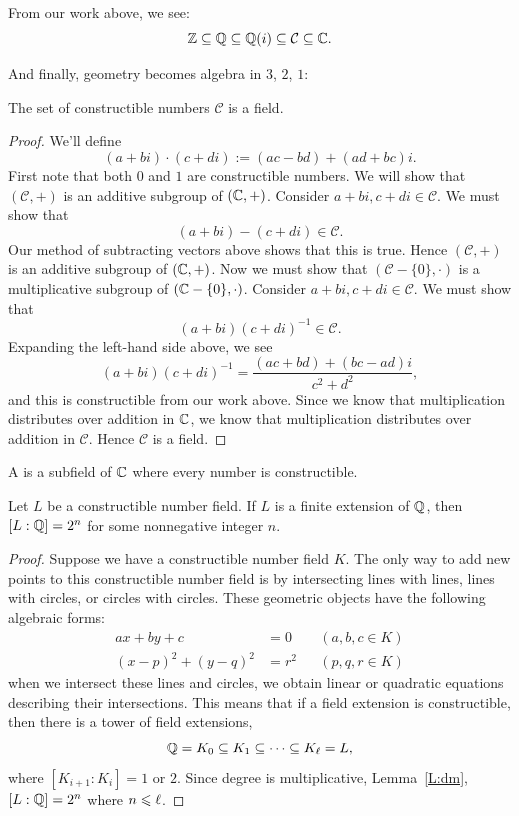 \documentclass{ximera}
\begin{document}
From our work above, we see:
\[
\mathbb Z\subseteq \mathbb Q \subseteq \mathbb Q(i) \subseteq \mathcal{C} \subseteq \mathbb C.
\]

And finally, geometry becomes algebra in $3$, $2$, $1$:

\begin{lemma}
  The set of constructible numbers $\mathcal{C}$ is a field.
  \begin{proof}
    We'll define
    \[
    (a+ bi)\cdot(c+di) := (ac-bd) + (ad+bc)i.
    \]
    First note that both $0$ and $1$ are constructible numbers. We
    will show that $(\mathcal{C},+)$ is an additive subgroup of
    $(\mathbb C,+)$. Consider $a+ bi, c+di \in \mathcal{C}$. We must show
    that
    \[
    (a+ bi)-(c+di)\in \mathcal{C}.
    \]
    Our method of subtracting vectors above shows that this is
    true. Hence $(\mathcal{C},+)$ is an additive subgroup of
    $(\mathbb C,+)$. Now we must show that $(\mathcal{C}-\{0\},\cdot)$ is a
    multiplicative subgroup of $(\mathbb C-\{0\},\cdot)$. Consider $a+ bi,
    c+di \in \mathcal{C}$. We must show that
    \[
    (a+ bi)(c+di)^{-1} \in \mathcal{C}.
    \]
    Expanding the left-hand side above, we see
    \[
    (a+ bi)(c+di)^{-1} = \frac{(ac+bd) + (bc-ad)i}{c^2 + d^2},
    \]
    and this is constructible from our work above. Since we know that
    multiplication distributes over addition in $\mathbb C$, we know that
    multiplication distributes over addition in $\mathcal{C}$. Hence
    $\mathcal{C}$ is a field.
  \end{proof}
\end{lemma}


\begin{definition}
  A  is a subfield of $\mathbb C$ where every
  number is constructible.
\end{definition}

\begin{theorem}\label{T:dc}
  Let $L$ be a constructible number field. If $L$ is a finite
  extension of $\mathbb Q$, then $[L: \mathbb Q] = 2^n$ for some nonnegative integer
  $n$.
  \begin{proof}
    Suppose we have a constructible number field $K$. The only way to
    add new points to this constructible number field is by
    intersecting lines with lines, lines with circles, or circles with
    circles. These geometric objects have the following algebraic
    forms:
    \begin{align*}
      ax + by + c &= 0 & & (a,b,c\in K)\\
      (x-p)^2 + (y-q)^2 &= r^2 & & (p,q,r\in K)
    \end{align*}
    when we intersect these lines and circles, we obtain linear or
    quadratic equations describing their intersections. This means
    that if a field extension is constructible, then there is a tower
    of field extensions,
    \[
    \mathbb Q = K_0 \subseteq K_1 \subseteq \cdots \subseteq K_\ell=L,
    \]
    where $[K_{i+1}:K_i] = 1$ or $2$. Since degree is multiplicative,
    Lemma~\ref{L:dm}, $[L:\mathbb Q]=2^n$ where $n\leqslant \ell$.
  \end{proof}
\end{theorem}
\end{document}
